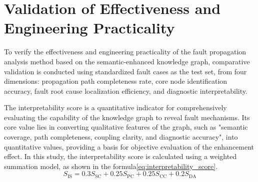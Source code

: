 \documentclass[conference]{IEEEconf}
\begin{document}
\section{Validation of Effectiveness and Engineering Practicality}
To verify the effectiveness and engineering practicality of the fault propagation analysis method based on the semantic-enhanced knowledge graph, comparative validation is conducted using standardized fault cases as the test set, from four dimensions: propagation path completeness rate, core node identification accuracy, fault root cause localization efficiency, and diagnostic interpretability\cite{dai2018charging}.

The interpretability score is a quantitative indicator for comprehensively evaluating the capability of the knowledge graph to reveal fault mechanisms. Its core value lies in converting qualitative features of the graph, such as "semantic coverage, path completeness, coupling clarity, and diagnostic accuracy", into quantitative values, providing a basis for objective evaluation of the enhancement effect. In this study, the interpretability score is calculated using a weighted summation model, as shown in the formula\ref{eq:interpretability_score}.
\begin{equation}
S_{\text{IS}} = 0.3 S_{\text{SC}} + 0.25 S_{\text{PC}} + 0.25 S_{\text{CC}}
+  0.2 S_{\text{DA}}
\label{eq:interpretability_score}
\end{equation}
\end{document}
